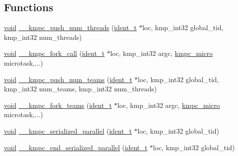\subsection*{Functions}
\begin{DoxyCompactItemize}
\item 
\hyperlink{ittnotify__static_8h_af941d56e55e3c5465135b60c4d6343ed}{void} \hyperlink{group__PARALLEL_ga345b3a5866deefefc91ae1e8958f49f4}{\-\_\-\-\_\-kmpc\-\_\-push\-\_\-num\-\_\-threads} (\hyperlink{group__BASIC__TYPES_ga690fda6b92f039a72db263c6b4394ddb}{ident\-\_\-t} $\ast$loc, kmp\-\_\-int32 global\-\_\-tid, kmp\-\_\-int32 num\-\_\-threads)
\item 
\hyperlink{ittnotify__static_8h_af941d56e55e3c5465135b60c4d6343ed}{void} \hyperlink{group__PARALLEL_gac2b7cc2fa78dde5381bcf00cfc48d124}{\-\_\-\-\_\-kmpc\-\_\-fork\-\_\-call} (\hyperlink{group__BASIC__TYPES_ga690fda6b92f039a72db263c6b4394ddb}{ident\-\_\-t} $\ast$loc, kmp\-\_\-int32 argc, \hyperlink{group__PARALLEL_gab49014fb4572e7d0f308fd9b1824daf7}{kmpc\-\_\-micro} microtask,...)
\item 
\hyperlink{ittnotify__static_8h_af941d56e55e3c5465135b60c4d6343ed}{void} \hyperlink{group__PARALLEL_gaae9462b03457d809faeb3e767a5b2283}{\-\_\-\-\_\-kmpc\-\_\-push\-\_\-num\-\_\-teams} (\hyperlink{group__BASIC__TYPES_ga690fda6b92f039a72db263c6b4394ddb}{ident\-\_\-t} $\ast$loc, kmp\-\_\-int32 global\-\_\-tid, kmp\-\_\-int32 num\-\_\-teams, kmp\-\_\-int32 num\-\_\-threads)
\item 
\hyperlink{ittnotify__static_8h_af941d56e55e3c5465135b60c4d6343ed}{void} \hyperlink{group__PARALLEL_ga1cab712d076ba1d2758b0c3bf5ffe38a}{\-\_\-\-\_\-kmpc\-\_\-fork\-\_\-teams} (\hyperlink{group__BASIC__TYPES_ga690fda6b92f039a72db263c6b4394ddb}{ident\-\_\-t} $\ast$loc, kmp\-\_\-int32 argc, \hyperlink{group__PARALLEL_gab49014fb4572e7d0f308fd9b1824daf7}{kmpc\-\_\-micro} microtask,...)
\item 
\hyperlink{ittnotify__static_8h_af941d56e55e3c5465135b60c4d6343ed}{void} \hyperlink{group__PARALLEL_ga7b1ba1cc8d9d2fea8654bbb1e59f079e}{\-\_\-\-\_\-kmpc\-\_\-serialized\-\_\-parallel} (\hyperlink{group__BASIC__TYPES_ga690fda6b92f039a72db263c6b4394ddb}{ident\-\_\-t} $\ast$loc, kmp\-\_\-int32 global\-\_\-tid)
\item 
\hyperlink{ittnotify__static_8h_af941d56e55e3c5465135b60c4d6343ed}{void} \hyperlink{group__PARALLEL_gac341818e68b06d910111e4cf08bb54dd}{\-\_\-\-\_\-kmpc\-\_\-end\-\_\-serialized\-\_\-parallel} (\hyperlink{group__BASIC__TYPES_ga690fda6b92f039a72db263c6b4394ddb}{ident\-\_\-t} $\ast$loc, kmp\-\_\-int32 global\-\_\-tid)
\end{DoxyCompactItemize}


